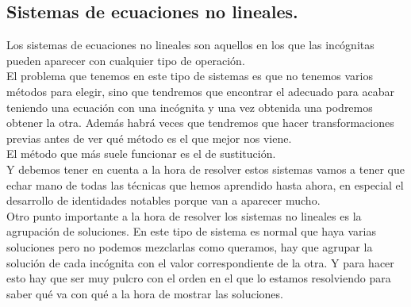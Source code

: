 \documentclass[a4paper,11pt,answers]{exam}
\begin{document}
\subsection{Sistemas de ecuaciones no lineales.}
Los sistemas de ecuaciones no lineales son aquellos en los que las incógnitas pueden aparecer
con cualquier tipo de operación.\\

El problema que tenemos en este tipo de sistemas es que no tenemos varios métodos para elegir,
sino que tendremos que encontrar el adecuado para acabar teniendo una ecuación con una incógnita
y una vez obtenida una podremos obtener la otra. Además habrá veces que tendremos que hacer
transformaciones previas antes de ver qué método es el que mejor nos viene.\\
El método que más suele funcionar es el de sustitución.\\
Y debemos tener en cuenta a la hora de resolver estos sistemas vamos a tener que echar mano
de todas las técnicas que hemos aprendido hasta ahora, en especial el desarrollo de identidades
notables porque van a aparecer mucho.\\

Otro punto importante a la hora de resolver los sistemas no lineales es la agrupación de soluciones.
En este tipo de sistema es normal que haya varias soluciones pero no podemos mezclarlas como queramos, hay que agrupar la solución de cada incógnita con el valor correspondiente de la otra. Y para
hacer esto hay que ser muy pulcro con el orden en el que lo estamos resolviendo para saber qué
va con qué a la hora de mostrar las soluciones.
\end{document}
